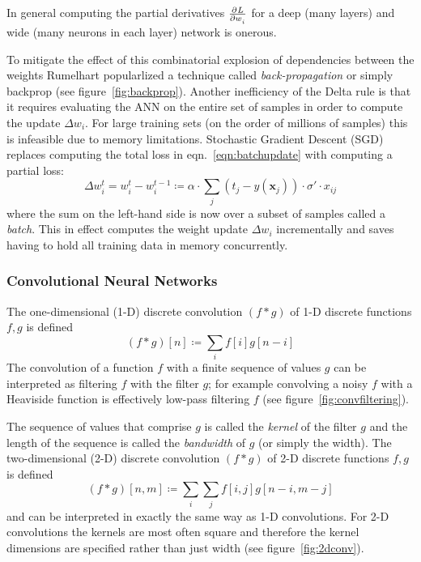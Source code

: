 In general computing the partial derivatives \(\pd{L}{w_i}\) for a deep (many layers) and wide (many neurons in each layer) network is onerous.
%

To mitigate the effect of this combinatorial explosion of dependencies between the weights Rumelhart \etal\cite{rumelhart1988learning} popularlized a technique called \textit{back-propagation} or simply backprop (see figure~\ref{fig:backprop}).
%
Another inefficiency of the Delta rule is that it requires evaluating the ANN on the entire set of samples in order to compute the update \(\Delta w_i\).
%
For large training sets (on the order of millions of samples) this is infeasible due to memory limitations.
%
Stochastic Gradient Descent (SGD) replaces computing the total loss in eqn.~\eqref{eqn:batchupdate} with computing a partial loss:
\begin{equation}
    \Delta w_i^t = w_i^t - w_i^{t-1} \coloneqq \alpha \cdot \sum_j (t_j-y(\mathbf{x}_j))\cdot \sigma'\cdot x_{ij}
    \label{eqn:sgd}
\end{equation}
where the sum on the left-hand side is now over a subset of samples called a \textit{batch}.
%
This in effect computes the weight update \(\Delta w_i\) incrementally and saves having to hold all training data in memory concurrently.
%
\subsubsection{Convolutional Neural Networks}
The one-dimensional (1-D) discrete convolution \((f*g)\) of 1-D discrete functions \(f,g\) is defined
\begin{equation}
    (f*g)[n]\coloneqq \sum _{i} f[i]g[n-i]
    \label{eqn:1dconv}
\end{equation}
The convolution of a function \(f\) with a finite sequence of values \(g\) can be interpreted as filtering \(f\) with the filter \(g\); for example convolving a noisy \(f\) with a Heaviside function is effectively low-pass filtering \(f\) (see figure~\ref{fig:convfiltering}).

%
The sequence of values that comprise \(g\) is called the \textit{kernel} of the filter \(g\) and the length of the sequence is called the \textit{bandwidth} of \(g\) (or simply the width).
%
The two-dimensional (2-D) discrete convolution \((f*g)\) of 2-D discrete functions \(f,g\) is defined
\begin{equation}
    (f*g)[n, m]\coloneqq \sum _{i}\sum _{j}f[i, j]g[n-i, m-j]
    \label{eqn:2dconv}
\end{equation}
and can be interpreted in exactly the same way as 1-D convolutions.
%
For 2-D convolutions the kernels are most often square and therefore the kernel dimensions are specified rather than just width (see figure~\ref{fig:2dconv}).


